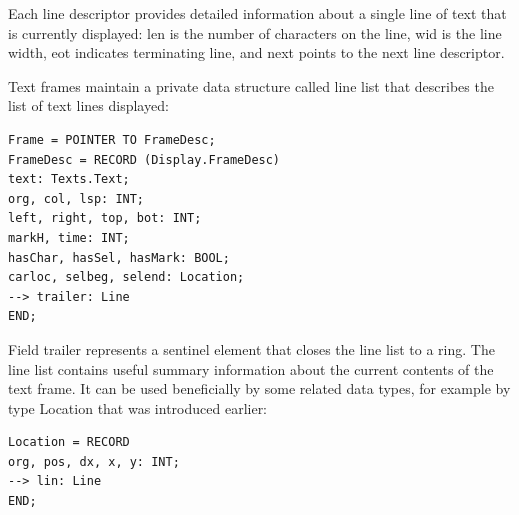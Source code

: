 Each line descriptor provides detailed information about a single line of text that is currently
displayed: len is the number of characters on the line, wid is the line width, eot indicates
terminating line, and next points to the next line descriptor.

Text frames maintain a private data structure called line list that describes the list of text lines
displayed:
\begin{verbatim}
Frame = POINTER TO FrameDesc;
FrameDesc = RECORD (Display.FrameDesc)
text: Texts.Text;
org, col, lsp: INT;
left, right, top, bot: INT;
markH, time: INT;
hasChar, hasSel, hasMark: BOOL;
carloc, selbeg, selend: Location;
--> trailer: Line
END;
\end{verbatim}

Field trailer represents a sentinel element that closes the line list to a ring.
The line list contains useful summary information about the current contents of the text frame. It can
be used beneficially by some related data types, for example by type Location that was introduced
earlier:
\begin{verbatim}
Location = RECORD
org, pos, dx, x, y: INT;
--> lin: Line
END;
\end{verbatim}

